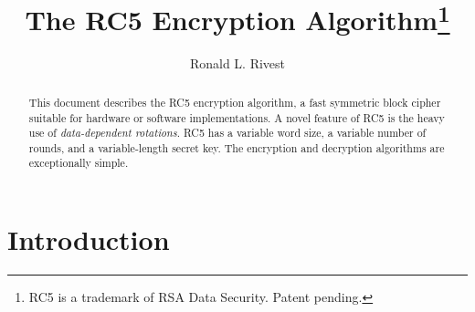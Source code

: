 \newcommand{\FOR}{{\bf for }}
\newcommand{\TO}{{\bf to }}
\newcommand{\DO}{{\bf do }}
\newcommand{\xor}{\oplus}
\newcommand{\lll}{ <\!\!\!<\!\!\!< }
\newcommand{\rrr}{ >\!\!\!>\!\!\!> }
\newcommand{\ceil}[1]{\lceil #1 \rceil}
\newcommand{\floor}[1]{\lfloor #1 \rfloor}




\title{The RC5 Encryption Algorithm\thanks{RC5 is a trademark of 
RSA Data Security. Patent pending.}}
\author{Ronald L. Rivest}
\maketitle

\begin{abstract}
This document describes the RC5 encryption algorithm, a fast
symmetric block cipher suitable for hardware or software
implementations.  A novel feature of RC5 is the heavy use of {\em
data-dependent rotations}.  RC5 has a variable word size, a variable
number of rounds, and a variable-length secret key.  The encryption
and decryption algorithms are exceptionally simple.
\end{abstract}

\section{Introduction}

